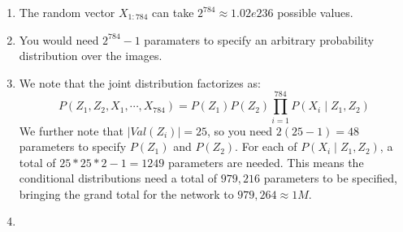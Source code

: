 \documentclass[12pt]{article}
\begin{document}
\begin{enumerate}
\item The random vector $X_{1:784}$ can take $2^{784} \approx 1.02e236$ possible values.
\item You would need $2^{784} - 1$ paramaters to specify an arbitrary probability distribution over the images.
\item We note that the joint distribution factorizes as:
$$
P(Z_1, Z_2, X_1, \cdots, X_{784}) = P(Z_1)P(Z_2)\prod_{i=1}^{784}P(X_i \mid Z_1, Z_2)
$$
We further note that $|Val(Z_i)| = 25$, so you need $2(25-1) = 48$ parameters to specify $P(Z_1)$ and $P(Z_2)$. For each of $P(X_i \mid Z_1, Z_2)$, a total of $25*25*2 - 1 = 1249$ parameters are needed. This means the conditional distributions need a total of $979,216$ parameters to be specified, bringing the grand total for the network to $979,264 \approx 1M$.
\item 
\end{enumerate}
\end{document}
